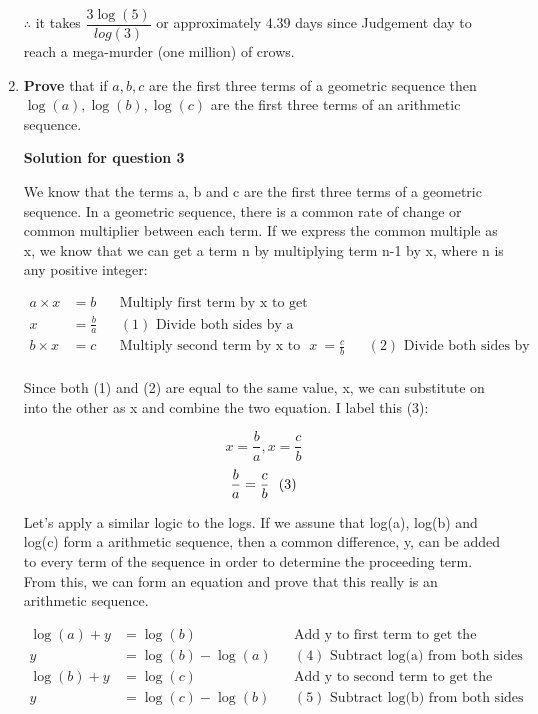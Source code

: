 \documentclass[12pt]{book}
\begin{document}
\begin{enumerate}
\begin{center}
    $\therefore$ it takes $\boxed{\dfrac{3\log(5)}{log(3)}}$ or approximately $\boxed{4.39}$ days since Judgement day 
    to reach a mega-murder (one million) of crows.
\end{center}

\newpage

\item \textbf{Prove} that if $a,b,c$ are the first three terms of a geometric sequence then $\log(a), \log(b), \log(c)$ are the first three terms of an arithmetic sequence.

\vspace{0.5cm}
\textbf{Solution for question 3}

\vspace{0.2cm}
We know that the terms a, b and c are the first three terms of a geometric 
sequence. In a geometric sequence, there is a common rate of change or common 
multiplier between each term. If we express the common multiple as x, we know that
we can get a term n by multiplying term n-1 by x, where n is any positive integer:

\begin{align*}
    a \times x &= b && \text{Multiply first term by x to get second term}\\
    x &= \frac{b}{a} && (1)\text{ Divide both sides by a} \\
    b \times x &= c && \text{Multiply second term by x to get third term}
    x &= \frac{c}{b} && (2)\text{ Divide both sides by b} \\
\end{align*}

Since both (1) and (2) are equal to the same value, x, we can 
substitute on into the other as x and combine the two equation. 
I label this (3):

$$x = \frac{b}{a}, x = \frac{c}{b}$$
$$\frac{b}{a} = \frac{c}{b} \text{\space \space (3)}$$

Let's apply a similar logic to the logs. If we assune that log(a), log(b) and log(c) 
form a arithmetic sequence, then a common difference, y, can be added 
to every term of the sequence in order to determine the proceeding term. From this, 
we can form an equation and prove that this really is an arithmetic sequence.

\begin{align*}
    \log(a) + y &= \log(b) && \text{Add y to first term to get the second term} \\
    y &= \log(b) - \log(a) && (4)\text{ Subtract log(a) from both sides} \\
    \log(b) + y &= \log(c) && \text{Add y to second term to get the third term} \\
    y &= \log(c) - \log(b) && (5)\text{ Subtract log(b) from both sides} \\
\end{align*}


\end{enumerate}
\end{document}
